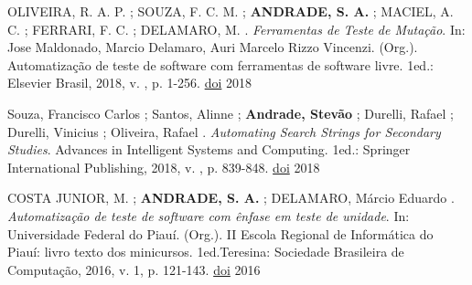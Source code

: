 
\begin{cvhonors}

  \cvhonor
    {\faBook} %
    {OLIVEIRA, R. A. P. ; SOUZA, F. C. M. ; \textbf{ANDRADE, S. A.} ; MACIEL, A. C. ; FERRARI, F. C. ; DELAMARO, M. . \textit{Ferramentas de Teste de Mutação}. In: Jose Maldonado, Marcio Delamaro, Auri Marcelo Rizzo Vincenzi. (Org.). Automatização de teste de software com ferramentas de software livre. 1ed.: Elsevier Brasil, 2018, v. , p. 1-256.} %
    {\href{https://avvts.net.br/livro-ats/05-Mutacao/cap-05.html}{doi}} %
    {2018} %

  \cvhonor
    {\faBook} %
    {Souza, Francisco Carlos ; Santos, Alinne ; \textbf{Andrade, Stevão} ; Durelli, Rafael ; Durelli, Vinicius ; Oliveira, Rafael . \textit{Automating Search Strings for Secondary Studies}. Advances in Intelligent Systems and Computing. 1ed.: Springer International Publishing, 2018, v. , p. 839-848.} %
    {\href{http://dx.doi.org/10.1007/978-3-319-54978-1_104}{doi}} %
    {2018} %
    
  \cvhonor
    {\faBook} %
    {COSTA JUNIOR, M. ; \textbf{ANDRADE, S. A.} ; DELAMARO, Márcio Eduardo . \textit{Automatização de teste de software com ênfase em teste de unidade}. In: Universidade Federal do Piauí. (Org.). II Escola Regional de Informática do Piauí: livro texto dos minicursos. 1ed.Teresina: Sociedade Brasileira de Computação, 2016, v. 1, p. 121-143.} %
    {\href{10.13140/RG.2.2.36132.68485}{doi}} %
    {2016} %

\end{cvhonors}



